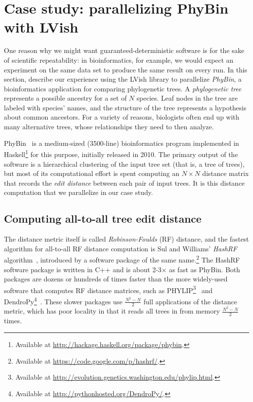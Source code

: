 \section{Case study: parallelizing PhyBin with LVish}\label{s:lvish-phybin}

One reason why we might want guaranteed-deterministic software is for
the sake of scientific repeatability: in bioinformatics, for example,
we would expect an experiment on the same data set to produce the same
result on every run.  In this section,  describe our experience using
the LVish library to parallelize \emph{PhyBin}, a bioinformatics
application for comparing phylogenetic trees.  A \emph{phylogenetic
  tree} represents a possible ancestry for a set of $N$ species.  Leaf
nodes in the tree are labeled with species' names, and the structure
of the tree represents a hypothesis about common ancestors. For a
variety of reasons, biologists often end up with many alternative
trees, whose relationships they need to then analyze.

PhyBin~\cite{PhyBin} is a medium-sized (3500-line) bioinformatics
program implemented in Haskell\footnote{Available at
  \url{http://hackage.haskell.org/package/phybin}.} for this purpose,
initially released in 2010.  The primary output of the software is a
hierarchical clustering of the input tree set (that is, a tree of
trees), but most of its computational effort is spent computing an $N
\times N$ distance matrix that records the \emph{edit distance}
between each pair of input trees.  It is this distance computation
that we parallelize in our case study.

\subsection{Computing all-to-all tree edit distance}

The distance metric itself is called \emph{Robinson-Foulds} (RF)
distance, and the fastest algorithm for all-to-all RF distance
computation is Sul and Williams' \emph{HashRF}
algorithm~\cite{hashrf}, introduced by a software package of the same
name.\footnote{Available at \url{https://code.google.com/p/hashrf/}.}
The HashRF software package is written in C++ and is about 2-3$\times$
as fast as PhyBin.  Both packages are dozens or hundreds of times
faster than the more widely-used software that computes RF distance
matrices, such as PHYLIP\footnote{Available at
  \url{http://evolution.genetics.washington.edu/phylip.html}.}~\cite{phylip}
and DendroPy\footnote{Available at
  \url{http://pythonhosted.org/DendroPy/}.}~\cite{dendropy}.  These
slower packages use $\frac{N^2-N}{2}$ full applications of the
distance metric, which has poor locality in that it reads all trees in
from memory $\frac{N^2-N}{2}$ times.

